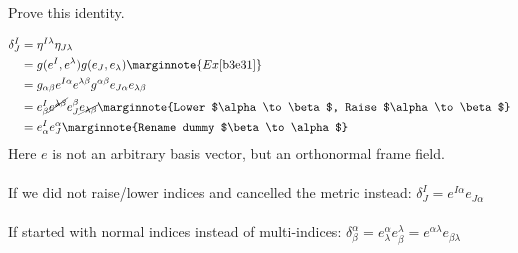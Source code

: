 \documentclass[10pt]{article}
\begin{document}
\begin{example}
	Prove this identity.
\end{example}
\sol $$
\begin{aligned}
	\delta_J^I &= \eta^{I\lambda}\eta_{J\lambda}\\
	&= g(e^I,e^\lambda)g(e_J,e_\lambda)\marginnote{Ex \ref{b3e31}}\\
	&= g_{\alpha\beta}e^{I\alpha}e^{\lambda\beta}g^{\alpha\beta}e_{J\alpha}e_{\lambda\beta}\\
	&= e^I_\beta\cancel{e^{\lambda\beta}}e_J^\beta\cancel{e_{\lambda\beta}}\marginnote{Lower $\alpha\to\beta$, Raise $\alpha\to\beta$}\\
	&= e^I_\alpha e_J^\alpha\marginnote{Rename dummy $\beta\to\alpha$}
\end{aligned}
$$
Here $e$ is not an arbitrary basis vector, but an orthonormal frame field.\\\\
If we did not raise/lower indices and cancelled the metric instead: $\delta_J^I = e^{I\alpha} e_{J\alpha}$\\\\
If started with normal indices instead of multi-indices: $\delta_\beta^\alpha = e^\alpha_\lambda e_\beta^\lambda = e^{\alpha\lambda} e_{\beta\lambda}$\\\\
\end{document}
